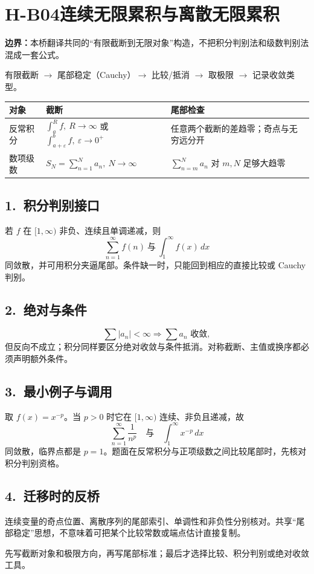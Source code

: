\documentclass[UTF8,a4paper,10pt]{ctexart}
\begin{document}
\section*{H-B04\quad 连续无限累积与离散无限累积}
\textbf{边界：}本桥翻译共同的“有限截断到无限对象”构造，不把积分判别法和级数判别法混成一套公式。
\begin{tcolorbox}[title=共同骨架]
有限截断 $\longrightarrow$ 尾部稳定（Cauchy）$\longrightarrow$ 比较/抵消
$\longrightarrow$ 取极限 $\longrightarrow$ 记录收敛类型。
\end{tcolorbox}
\begin{tabularx}{\linewidth}{@{}lXX@{}}
\toprule
对象 & 截断 & 尾部检查\\ \midrule
反常积分 & $\int_a^R f,\ R\to\infty$ 或 $\int_{a+\varepsilon}^b f,\ \varepsilon\to0^+$ & 任意两个截断的差趋零；奇点与无穷远分开\\
数项级数 & $S_N=\sum_{n=1}^{N}a_n,\ N\to\infty$ & $\sum_{n=m}^{N}a_n$ 对 $m,N$ 足够大趋零\\
\bottomrule
\end{tabularx}
\subsection*{1.\ 积分判别接口}
若 $f$ 在 $[1,\infty)$ 非负、连续且单调递减，则
\[
\sum_{n=1}^{\infty}f(n)\ \text{与}\ \int_1^\infty f(x)\,dx
\]
同敛散，并可用积分夹逼尾部。条件缺一时，只能回到相应的直接比较或 Cauchy 判别。
\subsection*{2.\ 绝对与条件}
\[
\sum |a_n|<\infty\Rightarrow\sum a_n\text{ 收敛},
\]
但反向不成立；积分同样要区分绝对收敛与条件抵消。对称截断、主值或换序都必须声明额外条件。
\subsection*{3.\ 最小例子与调用}
取 $f(x)=x^{-p}$。当 $p>0$ 时它在 $[1,\infty)$ 连续、非负且递减，故
\[
\sum_{n=1}^{\infty}\frac1{n^p}\quad\text{与}\quad
\int_1^\infty x^{-p}\,dx
\]
同敛散，临界点都是 $p=1$。题面在反常积分与正项级数之间比较尾部时，先核对积分判别资格。

\subsection*{4.\ 迁移时的反桥}
连续变量的奇点位置、离散序列的尾部索引、单调性和非负性分别核对。共享“尾部稳定”思想，不意味着可把某个比较常数或端点估计直接复制。
\begin{tcolorbox}[title=检查句]
先写截断对象和极限方向，再写尾部标准；最后才选择比较、积分判别或绝对收敛工具。
\end{tcolorbox}
\end{document}

